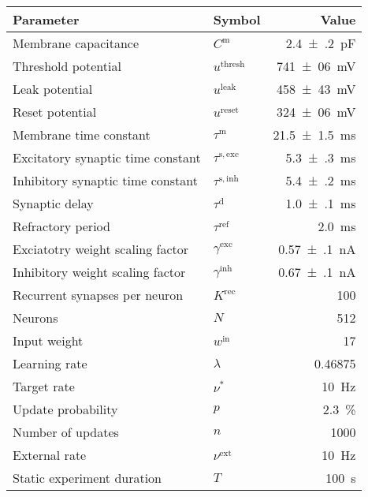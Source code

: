 \footnotesize
\begin{ruledtabular}
	\begin{tabular}{llr}
		\textbf{Parameter} 			& \textbf{Symbol}		& \textbf{Value} \\
		\hline
		Membrane capacitance 			& $C^\mathrm{m}$		& \SI{2.4(2)}{\pico\farad} \\
		Threshold potential			& $u^\mathrm{thresh}$		& \SI{741(06)}{\milli\volt} \\
		Leak potential				& $u^\mathrm{leak}$		& \SI{458(43)}{\milli\volt} \\
		Reset potential				& $u^\mathrm{reset}$		& \SI{324(06)}{\milli\volt} \\
		Membrane time constant			& $\tau^\mathrm{m}$		& \SI{21.5(15)}{\milli\second} \\
		Excitatory synaptic time constant	& $\tau^\mathrm{s,exc}$		& \SI{5.3(3)}{\milli\second} \\
		Inhibitory synaptic time constant	& $\tau^\mathrm{s,inh}$		& \SI{5.4(2)}{\milli\second} \\
		Synaptic delay				& $\tau^\mathrm{d}$		& \SI{1.0(1)}{\milli\second} \\
		Refractory period			& $\tau^\mathrm{ref}$		& \SI{2.0}{\milli\second} \\
		Exciatotry weight scaling factor	& $\gamma^\mathrm{exc}$		& \SI{0.57(10)}{\nano\ampere} \\
		Inhibitory weight scaling factor	& $\gamma^\mathrm{inh}$		& \SI{0.67(10)}{\nano\ampere} \\
		\hline
		Recurrent synapses per neuron		& $K^\mathrm{rec}$		& \SI{100}{} \\
		Neurons					& $N$				& \SI{512}{} \\
		Input weight				& $w^\mathrm{in}$		& \SI{17}{} \\
		\hline
		Learning rate				& $\lambda$			& \SI{0.46875}{} \\
		Target rate				& $\nu^\ast$			& \SI{10}{\hertz} \\
		Update probability			& $p$				& \SI{2.3}{\percent} \\
		Number of updates			& $n$				& \SI{1000}{} \\
		\hline
		External rate				& $\nu^\mathrm{ext}$		& \SI{10}{\hertz} \\
		\hline
		Static experiment duration		& $T$				& \SI{100}{\second} \\
	\end{tabular}
\end{ruledtabular}
